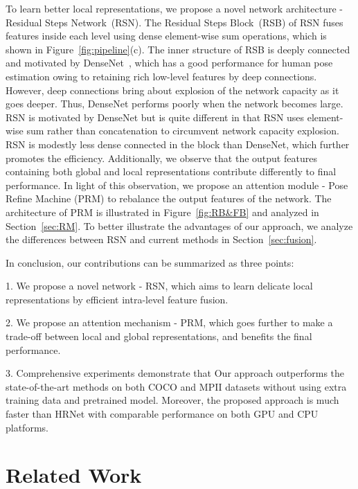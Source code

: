 \documentclass[runningheads]{llncs}
\begin{document}
To learn better local representations, we propose a novel network architecture - Residual Steps Network~(RSN). The Residual Steps Block~(RSB) of RSN fuses features inside each level using dense element-wise sum operations, which is shown in Figure~\ref{fig:pipeline}(c). 
The inner structure of RSB is deeply connected and motivated by DenseNet~\cite{densenet}, which has a good performance for human pose estimation owing to retaining rich low-level features by deep connections. However, deep connections bring about explosion of the network capacity as it goes deeper. Thus, DenseNet performs poorly when the network becomes large. RSN is motivated by DenseNet but is quite different in that RSN uses element-wise sum rather than concatenation to circumvent network capacity explosion. RSN is modestly less dense connected in the block than DenseNet, which further promotes the efficiency. Additionally, we observe that the output features containing both global and local representations contribute differently to final performance. In light of this observation, we propose an attention module - Pose Refine Machine (PRM) to rebalance the output features of the network. The architecture of PRM is illustrated in Figure~\ref{fig:RB&FB} and analyzed in Section~\ref{sec:RM}. To better illustrate the advantages of our approach, we analyze the differences between RSN and current methods in Section~\ref{sec:fusion}. 



In conclusion, our contributions can be summarized as three points:





1. We propose a novel network - RSN, which aims to learn delicate local representations by efficient intra-level feature fusion.

2. We propose an attention mechanism - PRM, which goes further to make a trade-off between local and global representations, and benefits the final performance. 

3. Comprehensive experiments demonstrate that Our approach outperforms the state-of-the-art methods on both COCO and MPII datasets without using extra training data and pretrained model. Moreover, the proposed approach is much faster than HRNet with comparable performance on both GPU and CPU platforms.








\section{Related Work}
\end{document}
